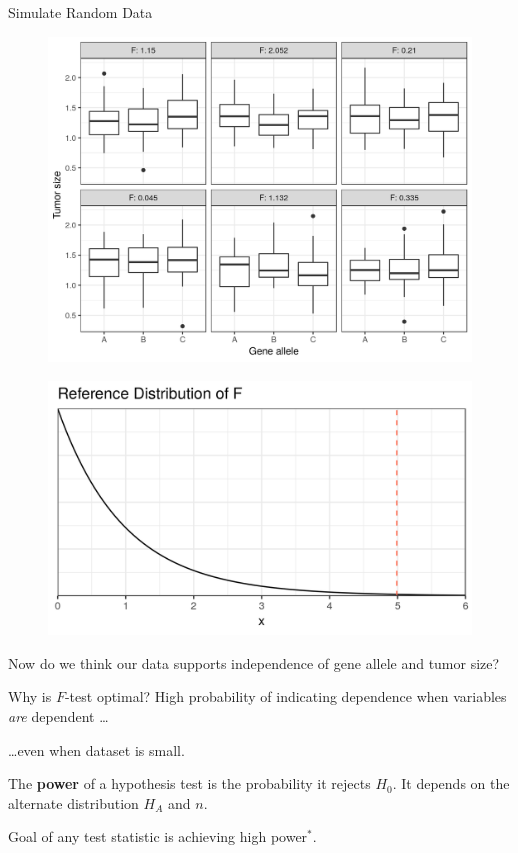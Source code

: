 \documentclass{beamer}
\begin{document}
\begin{frame}{Simulate Random Data}
\begin{figure}
  \includegraphics[scale=0.60]{simulation/null-plots}
\end{figure}
\end{frame}

\begin{frame}{}
\begin{figure}
  \includegraphics[scale=0.85]{simulation/null-dist}
\end{figure} 
Now do we think our data supports independence of gene allele and tumor size?
\end{frame}

\begin{frame}{Why is $F$-test optimal?}
\pause
High probability of indicating dependence when variables \emph{are} dependent \ldots\pause  

\bigskip
\ldots even when dataset is small.

\pause
\begin{definition}[Power]
The \textbf{power} of a hypothesis test is the probability it rejects $H_0$.  It depends on the alternate distribution $H_A$ and $n$.
\end{definition}
\bigskip 

\pause
Goal of any test statistic is achieving high power$^*$.
\end{frame}
\end{document}
